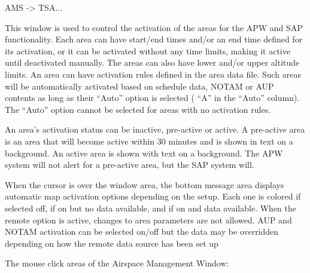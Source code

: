 \documentclass[a4paper,oneside,11pt]{memoir}
\begin{document}
 AMS -> TSA...

\bigskip


This window is used to control the activation of the areas for the APW and SAP functionality. Each area can have start/end times and/or an end time defined for its activation, or it can be activated without any time limits, making it active until deactivated manually. The areas can also have lower and/or upper altitude limits. An area can have activation rules defined in the area data file. Such areas will be automatically activated based on schedule data, NOTAM or AUP contents as long as their “Auto” option is selected ( “A” in the “Auto” column). The “Auto” option cannot be selected for areas with no activation rules.

\bigskip

An area’s activation status can be inactive, pre-active or active. A pre-active area is an area that will become active within 30 minutes and is shown in  text on a  background. An active area is shown with  text on a  background. The APW system will not alert for a pre-active area, but the SAP system will.

\bigskip

When the cursor is over the window area, the bottom message area displays automatic map activation options depending on the setup. Each one is colored  if selected off,  if on but no data available, and  if on and data available. When the remote option is active, changes to area parameters are not allowed. AUP and NOTAM activation can be selected on/off but the data may be overridden depending on how the remote data source has been set up

\bigskip

The mouse click areas of the Airspace Management Window:
\end{document}
